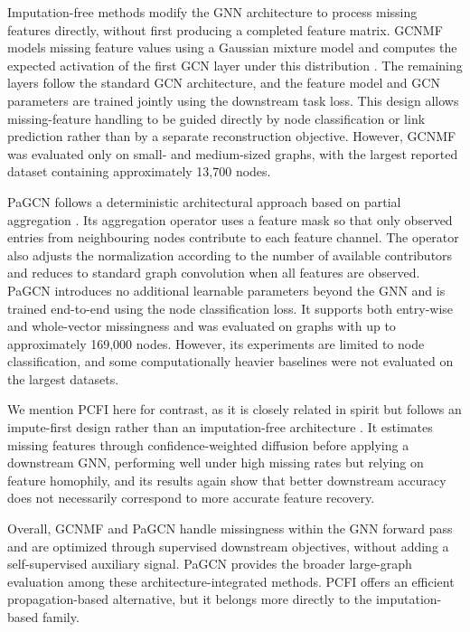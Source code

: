 Imputation-free methods modify the GNN architecture to process missing features directly, without first producing a completed feature matrix. GCNMF models missing feature values using a Gaussian mixture model and computes the expected activation of the first GCN layer under this distribution \cite{taguchi2021graph}. The remaining layers follow the standard GCN architecture, and the feature model and GCN parameters are trained jointly using the downstream task loss. This design allows missing-feature handling to be guided directly by node classification or link prediction rather than by a separate reconstruction objective. However, GCNMF was evaluated only on small- and medium-sized graphs, with the largest reported dataset containing approximately 13,700 nodes.

PaGCN follows a deterministic architectural approach based on partial aggregation \cite{zhang2024incomplete}. Its aggregation operator uses a feature mask so that only observed entries from neighbouring nodes contribute to each feature channel. The operator also adjusts the normalization according to the number of available contributors and reduces to standard graph convolution when all features are observed. PaGCN introduces no additional learnable parameters beyond the GNN and is trained end-to-end using the node classification loss. It supports both entry-wise and whole-vector missingness and was evaluated on graphs with up to approximately 169,000 nodes. However, its experiments are limited to node classification, and some computationally heavier baselines were not evaluated on the largest datasets.

We mention PCFI here for contrast, as it is closely related in spirit but follows an impute-first design rather than an imputation-free architecture \cite{um2023confidence}. It estimates missing features through confidence-weighted diffusion before applying a downstream GNN, performing well under high missing rates but relying on feature homophily, and its results again show that better downstream accuracy does not necessarily correspond to more accurate feature recovery.

Overall, GCNMF and PaGCN handle missingness within the GNN forward pass and are optimized through supervised downstream objectives, without adding a self-supervised auxiliary signal. PaGCN provides the broader large-graph evaluation among these architecture-integrated methods. PCFI offers an efficient propagation-based alternative, but it belongs more directly to the imputation-based family.






